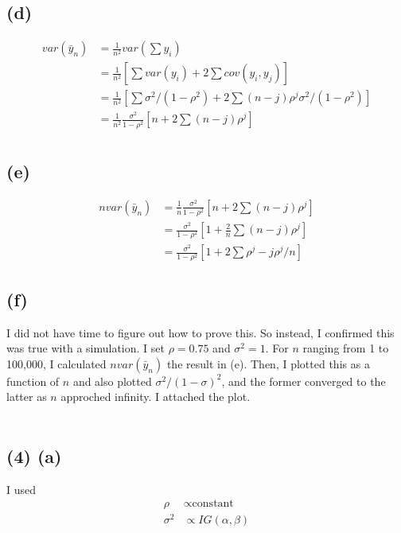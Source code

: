 \documentclass[11pt]{article}
\begin{document}
\subsection*{(d)}
\begin{align*}
var(\bar{y}_n) &= \frac{1}{n^2}var(\sum y_i)\\
&= \frac{1}{n^2}[\sum var(y_i) + 2\sum cov(y_i, y_j)]\\  
&= \frac{1}{n^2}[\sum \sigma^2/(1-\rho^2) + 2\sum   (n-j)\rho^j \sigma^2/(1-\rho^2)]\\
&= \frac{1}{n^2}\frac{\sigma^2}{1-\rho^2}[n  + 2\sum   (n-j)\rho^j] \\
\end{align*}

\subsection*{(e)}

\begin{align*}
nvar(\bar{y}_n)
&= \frac{1}{n}\frac{\sigma^2}{1-\rho^2}[n  + 2\sum   (n-j)\rho^j]\\
&= \frac{\sigma^2}{1-\rho^2}[1  + \frac{2}{n}\sum   (n-j)\rho^j]\\
&= \frac{\sigma^2}{1-\rho^2}[1  + 2\sum   \rho^j-j\rho^j/n]
\end{align*}



\subsection*{(f)} I did not have time to figure out how to prove this. So instead, I confirmed this was true with a simulation. I set $\rho = 0.75$ and $\sigma^2 = 1$. For $n$ ranging from 1 to 100,000, I calculated $nvar(\bar{y}_n)$ the result in (e). Then, I plotted this as a function of $n$ and also plotted $\sigma^2/(1−\sigma)^2$, and the former converged to the latter as $n$ approched infinity. I attached the plot.

\begin{align*}

\end{align*}

\subsection*{(4) (a)}
I used 
\begin{align*}
    \rho & \propto \text{constant}\\
    \sigma^2 & \propto IG(\alpha, \beta)
\end{align*}
\end{document}
